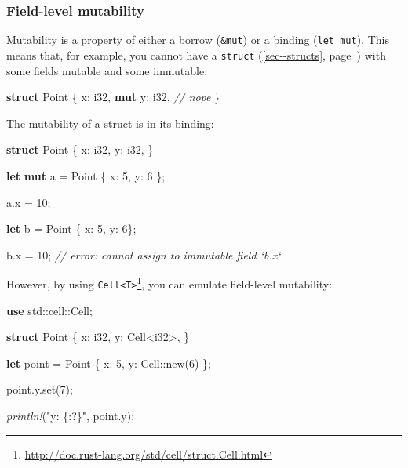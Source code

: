 \documentclass[a4paper,]{book}
\renewcommand*{\hyperlink}[2]{%
 #2 (\autoref{#1}, page~\pageref{#1})}
\newenvironment{Shaded}{\begin{snugshade}}{\end{snugshade}}
\newcommand{\KeywordTok}[1]{\textcolor[rgb]{0.13,0.29,0.53}{\textbf{{#1}}}}
\newcommand{\DataTypeTok}[1]{\textcolor[rgb]{0.13,0.29,0.53}{{#1}}}
\newcommand{\DecValTok}[1]{\textcolor[rgb]{0.00,0.00,0.81}{{#1}}}
\newcommand{\StringTok}[1]{\textcolor[rgb]{0.31,0.60,0.02}{{#1}}}
\newcommand{\CommentTok}[1]{\textcolor[rgb]{0.56,0.35,0.01}{\textit{{#1}}}}
\newcommand{\PreprocessorTok}[1]{\textcolor[rgb]{0.56,0.35,0.01}{\textit{{#1}}}}
\newcommand{\NormalTok}[1]{{#1}}
\renewcommand{\href}[2]{#2\footnote{\url{#1}}}
\begin{document}
\subsubsection{Field-level mutability}\label{field-level-mutability}

Mutability is a property of either a borrow (\texttt{\&mut}) or a
binding (\texttt{let\ mut}). This means that, for example, you cannot
have a \protect\hyperlink{sec--structs}{\texttt{struct}} with some
fields mutable and some immutable:

\begin{Shaded}
\begin{Highlighting}[]
\KeywordTok{struct} \NormalTok{Point \{}
    \NormalTok{x: }\DataTypeTok{i32}\NormalTok{,}
    \KeywordTok{mut} \NormalTok{y: }\DataTypeTok{i32}\NormalTok{, }\CommentTok{// nope}
\NormalTok{\}}
\end{Highlighting}
\end{Shaded}

The mutability of a struct is in its binding:

\begin{Shaded}
\begin{Highlighting}[]
\KeywordTok{struct} \NormalTok{Point \{}
    \NormalTok{x: }\DataTypeTok{i32}\NormalTok{,}
    \NormalTok{y: }\DataTypeTok{i32}\NormalTok{,}
\NormalTok{\}}

\KeywordTok{let} \KeywordTok{mut} \NormalTok{a = Point \{ x: }\DecValTok{5}\NormalTok{, y: }\DecValTok{6} \NormalTok{\};}

\NormalTok{a.x = }\DecValTok{10}\NormalTok{;}

\KeywordTok{let} \NormalTok{b = Point \{ x: }\DecValTok{5}\NormalTok{, y: }\DecValTok{6}\NormalTok{\};}

\NormalTok{b.x = }\DecValTok{10}\NormalTok{; }\CommentTok{// error: cannot assign to immutable field `b.x`}
\end{Highlighting}
\end{Shaded}

However, by using
\href{http://doc.rust-lang.org/std/cell/struct.Cell.html}{\texttt{Cell\textless{}T\textgreater{}}},
you can emulate field-level mutability:

\begin{Shaded}
\begin{Highlighting}[]
\KeywordTok{use} \NormalTok{std::cell::Cell;}

\KeywordTok{struct} \NormalTok{Point \{}
    \NormalTok{x: }\DataTypeTok{i32}\NormalTok{,}
    \NormalTok{y: Cell<}\DataTypeTok{i32}\NormalTok{>,}
\NormalTok{\}}

\KeywordTok{let} \NormalTok{point = Point \{ x: }\DecValTok{5}\NormalTok{, y: Cell::new(}\DecValTok{6}\NormalTok{) \};}

\NormalTok{point.y.set(}\DecValTok{7}\NormalTok{);}

\PreprocessorTok{println!}\NormalTok{(}\StringTok{"y: \{:?\}"}\NormalTok{, point.y);}
\end{Highlighting}
\end{Shaded}
\end{document}
